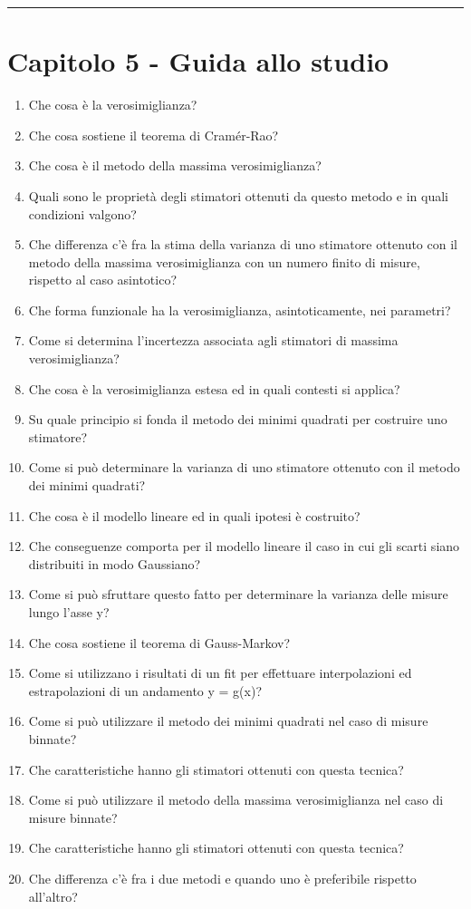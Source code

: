 \vspace{0.05cm}
\par\noindent\rule{\textwidth}{2pt}

\section{Capitolo 5 - Guida allo studio}

\begin{enumerate}
	\item Che cosa \`{e} la verosimiglianza?
	\item Che cosa sostiene il teorema di Cram\'{e}r-Rao?
	\item Che cosa \`{e} il metodo della massima verosimiglianza?
	\item Quali sono le propriet\`{a} degli stimatori ottenuti da questo metodo e in quali condizioni   valgono?
	\item Che differenza c'\`{e} fra la stima della varianza di uno stimatore ottenuto con il metodo della massima verosimiglianza con un numero finito di misure, rispetto al caso asintotico?
	\item Che forma funzionale ha la verosimiglianza, asintoticamente, nei parametri?
	\item Come si determina l'incertezza associata agli stimatori di massima verosimiglianza?
	\item Che cosa \`{e} la verosimiglianza estesa ed in quali contesti si applica?
	\item Su quale principio si fonda il metodo dei minimi quadrati per costruire uno stimatore?
	\item Come si può determinare la varianza di uno stimatore ottenuto con il metodo dei minimi quadrati?
	\item Che cosa \`{e} il modello lineare ed in quali ipotesi \`{e} costruito?
	\item Che conseguenze comporta per il modello lineare il caso in cui gli scarti siano distribuiti in modo Gaussiano?
	\item Come si può sfruttare questo fatto per determinare la varianza delle misure lungo l'asse y?
	\item Che cosa sostiene il teorema di Gauss-Markov?
	\item Come si utilizzano i risultati di un fit per effettuare interpolazioni ed estrapolazioni di un 	andamento y = g(x)?
	\item Come si può utilizzare il metodo dei minimi quadrati nel caso di misure binnate?
	\item Che caratteristiche hanno gli stimatori ottenuti con questa tecnica?
	\item Come si può utilizzare il metodo della massima verosimiglianza nel caso di misure binnate?
	\item Che caratteristiche hanno gli stimatori ottenuti con questa tecnica?
	\item Che differenza c'\`{e} fra i due metodi e quando uno \`{e} preferibile rispetto all'altro?

\end{enumerate}

